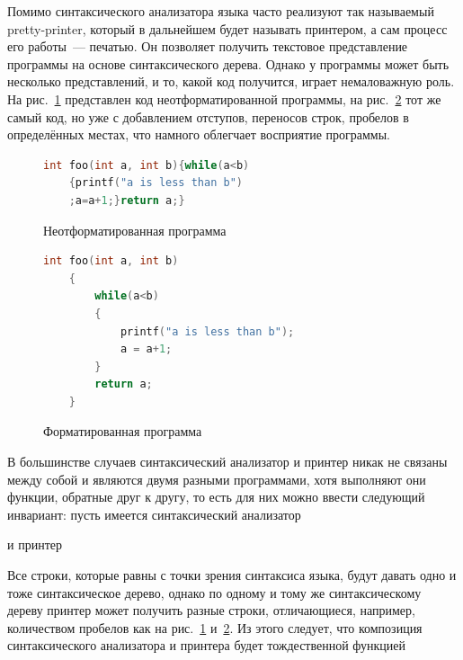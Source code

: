 Помимо синтаксического анализатора языка часто реализуют так называемый pretty-printer, 
который в дальнейшем будет называть принтером, а сам процесс его работы~--- печатью. Он позволяет 
получить текстовое представление программы на основе синтаксического дерева. Однако у программы может 
быть несколько представлений, и то, какой код получится, играет немаловажную роль. На рис.~\ref{nonformatted} 
представлен код неотформатированной программы, на рис.~\ref{formatted} тот же самый код, но уже с добавлением 
отступов, переносов строк, пробелов в определённых местах, что намного облегчает восприятие программы.

\begin{figure}[h]
\centering
\begin{lstlisting}[language=C]
    int foo(int a, int b){while(a<b)
    {printf("a is less than b")
    ;a=a+1;}return a;}
\end{lstlisting}
\caption{Неотформатированная программа}
\label{nonformatted}
\end{figure}

\begin{figure}[h]
\centering
\begin{lstlisting}[language=C]
    int foo(int a, int b)
    {
        while(a<b)
        {
            printf("a is less than b");
            a = a+1;
        }
        return a;
    }    
\end{lstlisting}
\caption{Форматированная программа}
\label{formatted}
\end{figure}

В большинстве случаев синтаксический анализатор и принтер никак не связаны между собой и являются двумя 
разными программами, хотя выполняют они функции, обратные друг к другу, то есть для них можно 
ввести следующий инвариант: пусть имеется синтаксический анализатор 



\noindent и принтер



Все строки, которые равны с точки зрения синтаксиса языка, будут давать одно и тоже синтаксическое дерево, 
однако по одному и тому же синтаксическому дереву принтер может получить разные строки, отличающиеся, 
например, количеством пробелов как на рис.~\ref{nonformatted} и~\ref{formatted}.
Из этого следует, что композиция синтаксического анализатора и принтера будет тождественной функцией

